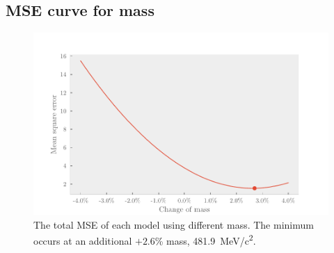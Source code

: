 \begin{appendices}
\section{MSE curve for mass}
\begin{figure}[ht]
  \centering
  \includegraphics[]{Figures/optimal_mse.pdf}
  \caption{\label{fig:optimal_mse} The total MSE of each model using different
    mass. The minimum occurs at an additional \(+2.6\)\% mass, \SI{481.9}{MeV/c^2}.}
\end{figure}


\end{appendices}